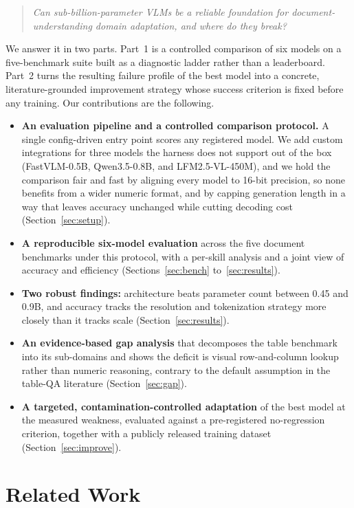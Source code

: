 \documentclass{article}
\begin{document}
\begin{quote}
\emph{Can sub-billion-parameter VLMs be a reliable foundation for
document-understanding domain adaptation, and where do they break?}
\end{quote}

We answer it in two parts. Part~1 is a controlled comparison of six models on a
five-benchmark suite built as a diagnostic ladder rather than a leaderboard.
Part~2 turns the resulting failure profile of the best model into a concrete,
literature-grounded improvement strategy whose success criterion is fixed before
any training. Our contributions are the following.

\begin{itemize}
\item \textbf{An evaluation pipeline and a controlled comparison protocol.} A
single config-driven entry point scores any registered model. We add custom
integrations for three models the harness does not support out of the box
(FastVLM-0.5B, Qwen3.5-0.8B, and LFM2.5-VL-450M), and we hold the comparison
fair and fast by aligning every model to 16-bit precision, so none benefits from
a wider numeric format, and by capping generation length in a way that leaves
accuracy unchanged while cutting decoding cost (Section~\ref{sec:setup}).
\item \textbf{A reproducible six-model evaluation} across the five document
benchmarks under this protocol, with a per-skill analysis and a joint view of
accuracy and efficiency (Sections~\ref{sec:bench} to~\ref{sec:results}).
\item \textbf{Two robust findings:} architecture beats parameter count between
0.45 and 0.9B, and accuracy tracks the resolution and tokenization strategy more
closely than it tracks scale (Section~\ref{sec:results}).
\item \textbf{An evidence-based gap analysis} that decomposes the table
benchmark into its sub-domains and shows the deficit is visual row-and-column
lookup rather than numeric reasoning, contrary to the default assumption in the
table-QA literature (Section~\ref{sec:gap}).
\item \textbf{A targeted, contamination-controlled adaptation} of the best
model at the measured weakness, evaluated against a pre-registered
no-regression criterion, together with a publicly released training dataset
(Section~\ref{sec:improve}).
\end{itemize}

\section{Related Work}
\label{sec:related}
\end{document}

